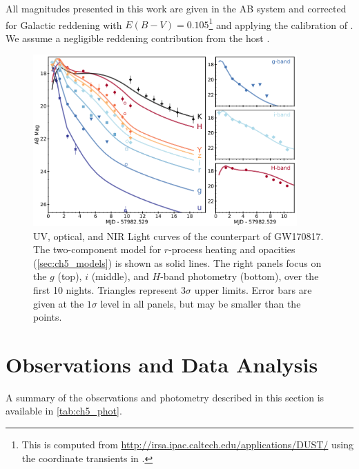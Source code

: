All magnitudes presented in this work are given in the AB system and corrected for Galactic reddening with $E(B-V)=0.105$\footnote{This is computed from \url{http://irsa.ipac.caltech.edu/applications/DUST/} using the coordinate transients in \cite{GW170817DECam}.} and applying the calibration of \cite{SchlaflyFinkbeiner11}. We assume a negligible reddening contribution from the host \citep{Blanchard+17}.

\begin{figure}[!t]
\begin{center}
\includegraphics[width=0.9\textwidth]{./figs/chapter5/DECam_lc_alt.pdf}
\caption{UV, optical, and NIR Light curves of the counterpart of GW170817. The two-component model for $r$-process heating and opacities (\cref{sec:ch5_models}) is shown as solid lines. The right panels focus on the $g$ (top), $i$ (middle), and $H$-band photometry (bottom), over the first 10 nights. Triangles represent 3$\sigma$ upper limits. Error bars are given at the $1\sigma$ level in all panels, but may be smaller than the points.}
\label{fig:ch5_lc_good}
\end{center}
\end{figure}

\section{Observations and Data Analysis}
\label{sec:ch5_observations}

A summary of the observations and photometry described in this section is available in \cref{tab:ch5_phot}.


